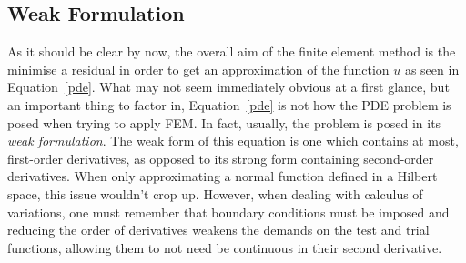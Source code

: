 \subsection{Weak Formulation}

As it should be clear by now, the overall aim of the finite element method is the minimise a residual in order to get an approximation of the function $u$ as seen in Equation~\eqref{pde}. What may not seem immediately obvious at a first glance, but an important thing to factor in, Equation~\eqref{pde} is not how the PDE problem is posed when trying to apply FEM. In fact, usually, the problem is posed in its \textit{weak formulation}. The weak form of this equation is one which contains at most, first-order derivatives, as opposed to its strong form containing second-order derivatives. When only approximating a normal function defined in a Hilbert space, this issue wouldn't crop up. However, when dealing with calculus of variations, one must remember that boundary conditions must be imposed and reducing the order of derivatives weakens the demands on the test and trial functions, allowing them to not need be continuous in their second derivative.

